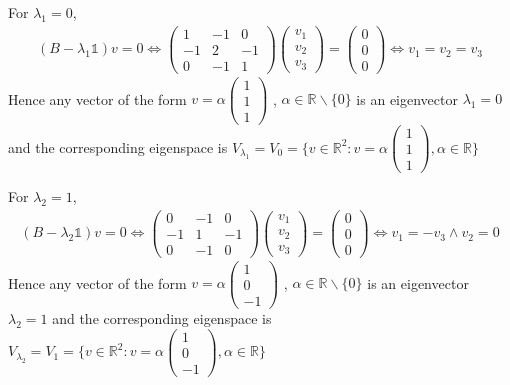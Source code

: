 \documentclass[a4paper,12pt,titlepage]{article}
\begin{document}
For $\lambda_1=0$,
\begin{align*}
(B-\lambda_1\mathds{1})v=0\Leftrightarrow\begin{pmatrix}
1&-1&0\\-1&2&-1\\0&-1&1\end{pmatrix}\begin{pmatrix}
v_1\\v_2\\v_3\end{pmatrix}=\begin{pmatrix}
0\\0\\0\end{pmatrix}\Leftrightarrow v_1=v_2=v_3
\end{align*}
Hence any vector of the form $v = \alpha\begin{pmatrix}
1\\1\\1\end{pmatrix}$
, $\alpha \in \mathbb{R} \backslash \lbrace0\rbrace$ is an eigenvector $\lambda_1 = 0$ and the corresponding eigenspace is
$V_{\lambda_1}=V_{0}=\lbrace v\in\mathbb{R}^2:v=\alpha\begin{pmatrix}
1\\1\\1\end{pmatrix} ,\alpha \in \mathbb{R} \rbrace$

For $\lambda_2=1$,
\begin{align*}
(B-\lambda_2\mathds{1})v=0\Leftrightarrow\begin{pmatrix}
0&-1&0\\-1&1&-1\\0&-1&0\end{pmatrix}\begin{pmatrix}
v_1\\v_2\\v_3\end{pmatrix}=\begin{pmatrix}
0\\0\\0\end{pmatrix}\Leftrightarrow v_1=-v_3\wedge v_2=0
\end{align*}
Hence any vector of the form $v = \alpha\begin{pmatrix}
1\\0\\-1\end{pmatrix}$
, $\alpha \in \mathbb{R} \backslash \lbrace0\rbrace$ is an eigenvector $\lambda_2 = 1$ and the corresponding eigenspace is
$V_{\lambda_2}=V_{1}=\lbrace v\in\mathbb{R}^2:v=\alpha\begin{pmatrix}
1\\0\\-1\end{pmatrix} ,\alpha \in \mathbb{R} \rbrace$
\end{document}
